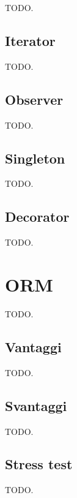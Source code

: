 \documentclass{article}
\begin{document}
TODO.

\subsection{Iterator}

TODO.

\subsection{Observer}

TODO.

\subsection{Singleton}

TODO.

\subsection{Decorator}

TODO.

\section{ORM}

TODO.

\subsection{Vantaggi}

TODO.

\subsection{Svantaggi}

TODO.

\subsection{Stress test}

TODO.
\end{document}
